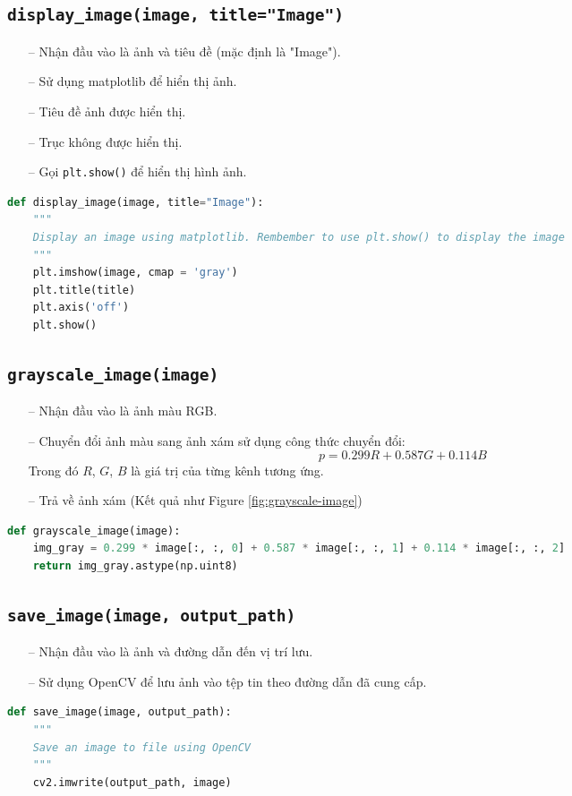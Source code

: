 \documentclass{article}
\begin{document}
\subsection{\texttt{display\_image(image, title="Image")}}
\begin{itemize}
    \item[--] Nhận đầu vào là ảnh và tiêu đề (mặc định là "Image").
    \item[--] Sử dụng matplotlib để hiển thị ảnh.
    \item[--] Tiêu đề ảnh được hiển thị.
    \item[--] Trục không được hiển thị.
    \item[--] Gọi \texttt{plt.show()} để hiển thị hình ảnh.
\end{itemize}
\begin{lstlisting}[language=Python]
def display_image(image, title="Image"):
    """
    Display an image using matplotlib. Rembember to use plt.show() to display the image
    """
    plt.imshow(image, cmap = 'gray')
    plt.title(title)
    plt.axis('off')
    plt.show()
\end{lstlisting}

\subsection{\texttt{grayscale\_image(image)}}
\begin{itemize}
    \item[--] Nhận đầu vào là ảnh màu RGB.
    \item[--] Chuyển đổi ảnh màu sang ảnh xám sử dụng công thức chuyển đổi:
    \[
    p = 0.299R + 0.587G + 0.114B
    \]
    Trong đó $R$, $G$, $B$ là giá trị của từng kênh tương ứng.
    \item[--] Trả về ảnh xám (Kết quả như Figure  \ref{fig:grayscale-image})
\end{itemize}
\begin{lstlisting}[language=Python]
def grayscale_image(image):
    img_gray = 0.299 * image[:, :, 0] + 0.587 * image[:, :, 1] + 0.114 * image[:, :, 2]
    return img_gray.astype(np.uint8)
\end{lstlisting}

\subsection{\texttt{save\_image(image, output\_path)}}
\begin{itemize}
    \item[--] Nhận đầu vào là ảnh và đường dẫn đến vị trí lưu.
    \item[--] Sử dụng OpenCV để lưu ảnh vào tệp tin theo đường dẫn đã cung cấp.
\end{itemize}
\begin{lstlisting}[language=Python]
def save_image(image, output_path):
    """
    Save an image to file using OpenCV
    """
    cv2.imwrite(output_path, image)
\end{lstlisting}
\end{document}
